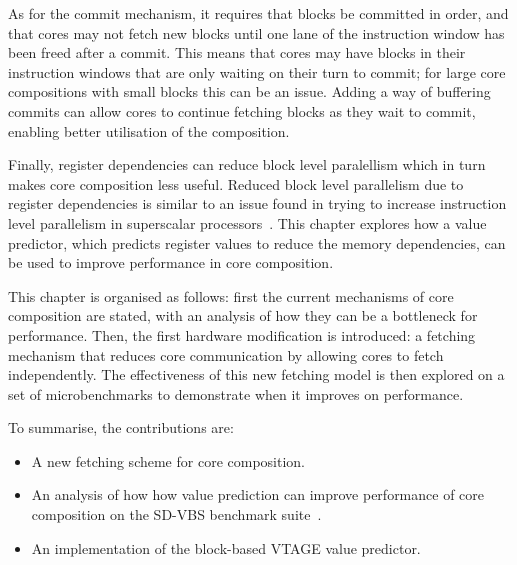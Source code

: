 As for the commit mechanism, it requires that blocks be committed in order, and that cores may not fetch new blocks until one lane of the instruction window has been freed after a commit.
This means that cores may have blocks in their instruction windows that are only waiting on their turn to commit; for large core compositions with small blocks this can be an issue.
Adding a way of buffering commits can allow cores to continue fetching blocks as they wait to commit, enabling better utilisation of the composition. 

Finally, register dependencies can reduce block level paralellism which in turn makes core composition less useful.
Reduced block level parallelism due to register dependencies is similar to an issue found in trying to increase instruction level parallelism in superscalar processors~\cite{peraisBeBop2015}.
This chapter explores how a value predictor, which predicts register values to reduce the memory dependencies, can be used to improve performance in core composition.

This chapter is organised as follows: first the current mechanisms of core composition are stated, with an analysis of how they can be a bottleneck for performance.
Then, the first hardware modification is introduced: a fetching mechanism that reduces core communication by allowing cores to fetch independently.
The effectiveness of this new fetching model is then explored on a set of microbenchmarks to demonstrate when it improves on performance.


To summarise, the contributions are:

\begin{itemize}
\item A new fetching scheme for core composition.
\item An analysis of how how value prediction can improve performance of core composition on the SD-VBS benchmark suite~\cite{sdvbs}.
\item An implementation of the block-based VTAGE value predictor.
\end{itemize}